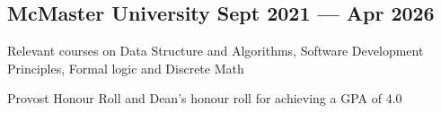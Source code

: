 
\subsection{{McMaster University \hfill Sept 2021 --- Apr 2026}}
\begin{zitemize}
    \item Relevant courses on Data Structure and Algorithms, Software Development Principles, Formal logic and Discrete Math
    \item Provost Honour Roll and Dean's honour roll for achieving a GPA of 4.0

\end{zitemize}

